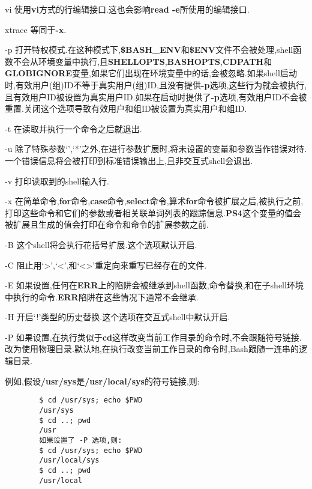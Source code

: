 \documentclass[draft,openany]{book}
\begin{document}
\begin{CJK}{UTF8}{gbsn}
\begin{basedescript}{\desclabelstyle{\nextlinelabel}\desclabelwidth{2.5em}}
\begin{basedescript}{\desclabelstyle{\nextlinelabel}\desclabelwidth{2.5em}}
        \item[vi] 使用\textbf{vi}方式的行编辑接口.这也会影响\textbf{read -e}所使用的编辑接口.
        \item[xtrace] 等同于\textbf{-x}.
        \end{basedescript}
    \item[-p] 打开特权模式.在这种模式下,\textbf{\$BASH\_ENV}和\textbf{\$ENV}文件不会被处理,shell函数不会从环境变量中执行,且\textbf{SHELLOPTS},\textbf{BASHOPTS},\textbf{CDPATH}和\textbf{GLOBIGNORE}变量,如果它们出现在环境变量中的话,会被忽略.如果shell启动时,有效用户(组)ID不等于真实用户(组)ID,且没有提供\textbf{-p}选项,这些行为就会被执行,且有效用户ID被设置为真实用户ID.如果在启动时提供了\textbf{-p}选项,有效用户ID不会被重置.关闭这个选项导致有效用户和组ID被设置为真实用户和组ID.
    \item[-t] 在读取并执行一个命令之后就退出.
    \item[-u] 除了特殊参数`\@',`*'之外,在进行参数扩展时,将未设置的变量和参数当作错误对待.一个错误信息将会被打印到标准错误输出上,且非交互式shell会退出.
    \item[-v] 打印读取到的shell输入行.
    \item[-x] 在简单命令,\textbf{for}命令,\textbf{case}命令,\textbf{select}命令,算术\textbf{for}命令被扩展之后,被执行之前,打印这些命令和它们的参数或者相关联单词列表的跟踪信息.\textbf{PS4}这个变量的值会被扩展且生成的值会打印在命令和命令的扩展参数之前.
    \item[-B] 这个shell将会执行花括号扩展.这个选项默认开启.
    \item[-C] 阻止用`\textgreater',`\textless',和`\textless\textgreater'重定向来重写已经存在的文件.
    \item[-E] 如果设置,任何在\textbf{ERR}上的陷阱会被继承到shell函数,命令替换,和在子shell环境中执行的命令.\textbf{ERR}陷阱在这些情况下通常不会继承.
    \item[-H] 开启`!'类型的历史替换.这个选项在交互式shell中默认开启.
    \item[-P] 如果设置,在执行类似于\textbf{cd}这样改变当前工作目录的命令时,不会跟随符号链接.改为使用物理目录.默认地,在执行改变当前工作目录的命令时,Bash跟随一连串的逻辑目录.\par
        例如,假设\textbf{/usr/sys}是\textbf{/usr/local/sys}的符号链接,则:
        \begin{verbatim}
        $ cd /usr/sys; echo $PWD
        /usr/sys
        $ cd ..; pwd
        /usr
        如果设置了 -P 选项,则:
        $ cd /usr/sys; echo $PWD
        /usr/local/sys
        $ cd ..; pwd
        /usr/local
        \end{verbatim}

\end{basedescript}
\end{CJK}
\end{document}
